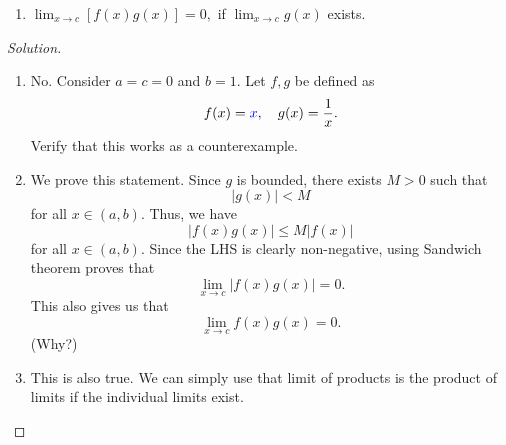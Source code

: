 \documentclass[12pt]{article}
\theoremstyle{definition}
\newenvironment{soln}{\begin{proof}[Solution]}{\end{proof}}
\begin{document}
\begin{itemize}[leftmargin=*]
\begin{enumerate}
    	\item $\displaystyle\lim_{x\to c}[f(x)g(x)] = 0,$ if $\displaystyle\lim_{x\to c}g(x)$ exists.
    \end{enumerate}
    \begin{soln}
    	\begin{enumerate}
    		\item No. Consider $a = c = 0$ and $b = 1.$ Let $f, g$ be defined as
    		\begin{equation*} 
    			f(x) = {\color{myupdatecolor}x}, \quad g(x) = \dfrac{1}{x}.
    		\end{equation*}
    		Verify that this works as a counterexample.
    		\item We prove this statement. Since $g$ is bounded, there exists $M > 0$ such that
    		\begin{equation*} 
    			|g(x)| < M
    		\end{equation*}
    		for all $x \in (a, b).$ Thus, we have
    		\begin{equation*} 
    			|f(x)g(x)| \le M|f(x)|
    		\end{equation*}
    		for all $x \in (a, b).$ Since the LHS is clearly non-negative, using Sandwich theorem proves that
    		\begin{equation*} 
    			\lim_{x\to c}|f(x)g(x)| = 0.
    		\end{equation*}
    		This also gives us that
    		\begin{equation*} 
    			\lim_{x\to c}f(x)g(x) = 0.
    		\end{equation*}
    		(Why?)
    		\item This is also true. We can simply use that limit of products is the product of limits if the individual limits exist.
    	\end{enumerate}
    \end{soln}
\end{itemize}
%
%
%
\end{document}
